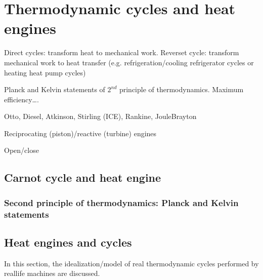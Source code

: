 \documentclass[letterpaper,10pt,english]{jupyterBook}
\begin{document}
\chapter{Thermodynamic cycles and heat engines}
\label{\detokenize{ch/heat-engines:thermodynamic-cycles-and-heat-engines}}\label{\detokenize{ch/heat-engines:classical-thermodynamics-heat-engines}}\label{\detokenize{ch/heat-engines::doc}}
\sphinxAtStartPar
{} Direct cycles: transform heat to mechanical work. Reverset cycle: transform mechanical work to heat transfer (e.g. refrigeration/cooling \sphinxhyphen{} refrigerator cycles \sphinxhyphen{} or heating \sphinxhyphen{} heat pump cycles)

\sphinxAtStartPar
{} Planck and Kelvin statements of \(2^{nd}\) principle of thermodynamics. Maximum efficiency….

\sphinxAtStartPar
{} Otto, Diesel, Atkinson, Stirling (ICE), Rankine, Joule\sphinxhyphen{}Brayton

\sphinxAtStartPar
{} Reciprocating (piston)/reactive (turbine) engines

\sphinxAtStartPar
{} Open/close


\section{Carnot cycle and heat engine}
\label{\detokenize{ch/heat-engines:carnot-cycle-and-heat-engine}}\label{\detokenize{ch/heat-engines:classical-thermodynamics-heat-engines-carnot}}

\subsection{Second principle of thermodynamics: Planck and Kelvin statements}
\label{\detokenize{ch/heat-engines:second-principle-of-thermodynamics-planck-and-kelvin-statements}}\label{\detokenize{ch/heat-engines:id1}}

\section{Heat engines and cycles}
\label{\detokenize{ch/heat-engines:heat-engines-and-cycles}}\label{\detokenize{ch/heat-engines:classical-thermodynamics-heat-engines-real}}
\sphinxAtStartPar
In this section, the idealization/model of real thermodynamic cycles performed by real\sphinxhyphen{}life machines are discussed.
\end{document}
